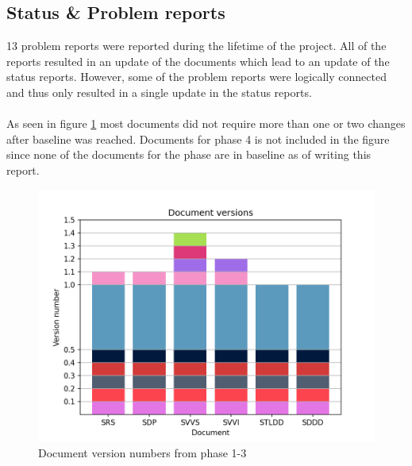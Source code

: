 \documentclass{article}
\begin{document}
    \subsection{Status \& Problem reports}
        13 problem reports were reported during the lifetime of the project. All of the reports
        resulted in an update of the documents which lead to an update of the status reports.
        However, some of the problem reports were logically connected and thus only resulted
        in a single update in the status reports.
        \\ \\
        As seen in figure \ref{fig:versions} most documents did not require more than one or two changes
        after baseline was reached. Documents for phase 4 is not included in the figure since none of the documents for the phase are in baseline as of writing this report.
        
        \begin{figure}[!htb]
            \centering
              \includegraphics[width=\linewidth]{images/document_versions.png}
              \caption{Document version numbers from phase 1-3}\label{fig:versions}
            \endminipage\hfill
        \end{figure}
        
\end{document}
